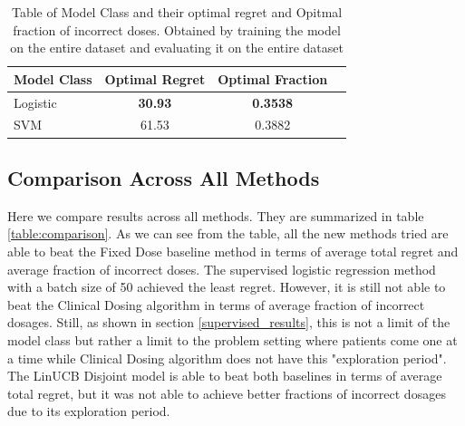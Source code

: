 \documentclass{article}
\begin{document}
\begin{table}[t]
	\caption{Table of Model Class and their optimal regret and Opitmal fraction of incorrect doses. Obtained by training the model on the entire dataset and evaluating it on the entire dataset}
	\label{table:supervised_optim}
	\vskip 0.15in
	\begin{center}
		\begin{small}
			\begin{sc}
				\begin{tabular}{lccc}
					\toprule
					Model Class         & Optimal Regret & Optimal Fraction\\
					\midrule
					Logistic & \textbf{30.93}          & \textbf{0.3538}  \\
					SVM                 & 61.53          & 0.3882 \\
					\bottomrule
				\end{tabular}
			\end{sc}
		\end{small}
	\end{center}
	\vskip -0.1in
\end{table}

\subsection{Comparison Across All Methods}
Here we compare results across all methods. They are summarized in table \ref{table:comparison}. As we can see from the table, all the new methods tried are able to beat the Fixed Dose baseline method in terms of average total regret and average fraction of incorrect doses. The supervised logistic regression method with a batch size of 50 achieved the least regret. However, it is still not able to beat the Clinical Dosing algorithm in terms of average fraction of incorrect dosages. Still, as shown in section \ref{supervised_results}, this is not a limit of the model class but rather a limit to the problem setting where patients come one at a time while Clinical Dosing algorithm does not have this "exploration period". The LinUCB Disjoint model is able to beat both baselines in terms of average total regret, but it was not able to achieve better fractions of incorrect dosages due to its exploration period.
\\
\end{document}
